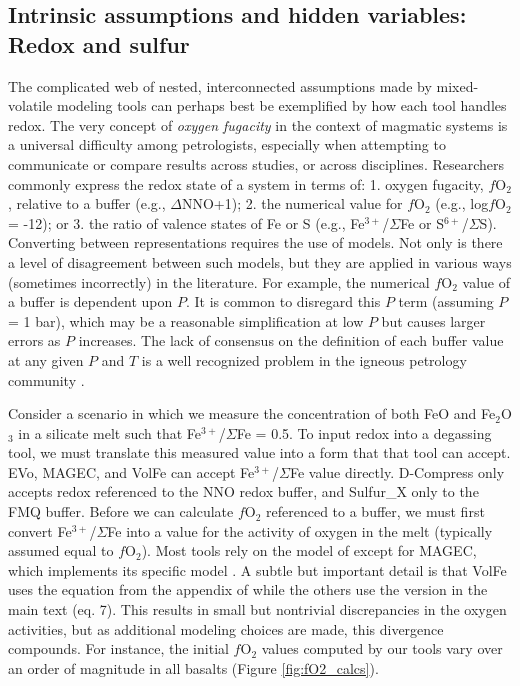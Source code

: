 \documentclass[draft, english]{volcanica-template}
\begin{document}
\subsection{Intrinsic assumptions and hidden variables: Redox and sulfur}
\label{sec:intrinsic-assumptions}
The complicated web of nested, interconnected assumptions made by mixed-volatile modeling tools can perhaps best be exemplified by how each tool handles redox. The very concept of \textit{oxygen fugacity} in the context of magmatic systems is a universal difficulty among petrologists, especially when attempting to communicate or compare results across studies, or across disciplines. Researchers commonly express the redox state of a system in terms of: 1. oxygen fugacity, $f$O$_2$, relative to a buffer (e.g., $\Delta$NNO+1); 2. the numerical value for $f$O$_2$ (e.g., log$f$O$_2$ = -12); or 3. the ratio of valence states of Fe or S (e.g., Fe$^{3+}$/$\Sigma$Fe or S$^{6+}$/$\Sigma$S). Converting between representations requires the use of models. Not only is there a level of disagreement between such models, but they are applied in various ways (sometimes incorrectly) in the literature. For example, the numerical $f$O$_2$ value of a buffer is dependent upon $P$. It is common to disregard this $P$ term (assuming $P$ = 1 bar), which may be a reasonable simplification at low $P$ but causes larger errors as $P$ increases. The lack of consensus on the definition of each buffer value at any given $P$ and $T$ is a well recognized problem in the igneous petrology community \parencite{wieser2023pysulfsat, anenburg2019redox}.

Consider a scenario in which we measure the concentration of both FeO and Fe$_2$O$_3$ in a silicate melt such that Fe$^{3+}$/$\Sigma$Fe = 0.5. To input redox into a degassing tool, we must translate this measured value into a form that that tool can accept. EVo, MAGEC, and VolFe can accept Fe$^{3+}$/$\Sigma$Fe value directly. D-Compress only accepts redox referenced to the NNO redox buffer, and Sulfur\_X only to the FMQ buffer. Before we can calculate $f$O$_2$ referenced to a buffer, we must first convert Fe$^{3+}$/$\Sigma$Fe into a value for the activity of oxygen in the melt (typically assumed equal to $f$O$_2$). Most tools rely on the model of \textcite{Kress1991} except for MAGEC, which implements its specific model \parencite{Sun2024}. A subtle but important detail is that VolFe uses the equation from the appendix of \textcite[][eqs. A-5 and A-6]{Kress1991} while the others use the version in the main text (eq. 7). This results in small but nontrivial discrepancies in the oxygen activities, but as additional modeling choices are made, this divergence compounds. For instance, the initial $f$O$_2$ values computed by our tools vary over an order of magnitude in all basalts (Figure \ref{fig:fO2_calcs}). 
\end{document}
